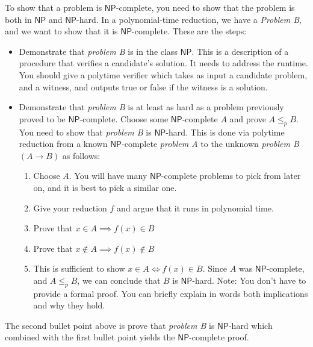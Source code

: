 \documentclass[12pt]{article}
\newcommand{\NP}{\mathsf{NP}}
\newcommand{\pr}{\leq_p}
\begin{document}
To show that a problem is $\NP$-complete, you need to show that the problem is both in $\NP$  and $\NP$-hard. In a polynomial-time reduction, we have a \textit{Problem B}, and we want to show that it is $\NP$-complete. These are the steps:
\begin{itemize}
\item Demonstrate that \textit{problem B} is in the class $\NP$. This is a description of a procedure that verifies a candidate's solution. It needs to address the runtime. You should give a polytime verifier which takes as input a candidate problem, and a witness, and outputs true or false if the witness is a solution.
\item Demonstrate that \textit{problem B} is at least as hard as a problem previously proved to be $\NP$-complete. Choose some $\NP$-complete $A$ and prove $A \pr B$. You need to show that \textit{problem B} is $\NP$-hard. This is done via polytime reduction from a known $\NP$-complete \textit{problem A} to the unknown \textit{problem B} $(A\rightarrow B)$ as follows:
\begin{enumerate}
\item Choose $A$. You will have many $\NP$-complete problems to pick from later on, and it is best to pick a similar one. 

\item Give your reduction $f$ and argue that it runs in polynomial time.

\item Prove that $x \in A \implies f(x) \in B$

\item Prove that $x \not \in A \implies f(x) \not \in B$

\item This is sufficient to show $x \in A \iff f(x) \in B$. Since $A$ was $\NP$-complete, and $A \pr B$, we can conclude that $B$ is $\NP$-hard. Note: You don't have to provide a formal proof. You can briefly explain in words both implications and why they hold. 
\end{enumerate}
\end{itemize}
The second bullet point above is prove that \textit{problem B} is $\NP$-hard which combined with the first bullet point yields the $\NP$-complete proof. \
\begin{itemize}
\end{itemize}

\newpage
\end{document}
